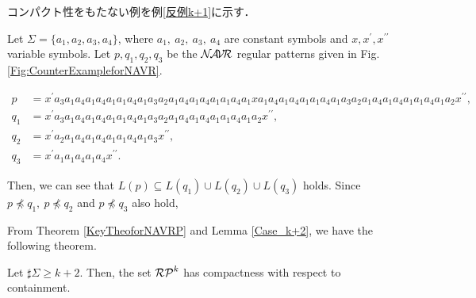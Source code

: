 コンパクト性をもたない例を例\ref{反例k+1}に示す．

\begin{ex}\label{Case_k+1}\label{反例k+1}
Let $\Sigma= \{a_{1}, a_{2}, a_{3}, a_{4} \}$, where $a_{1},~a_{2},~a_{3},~a_{4}$ are constant symbols and $x,x^{\prime},x^{\prime\prime}$ variable symbols.
Let $p,q_{1},q_{2},q_{3}$ be the $\mathcal{N\!A\!V\!R}$ regular patterns given in Fig. \ref{Fig:CounterExampleforNAVR}. 
\begin{figure*}[tb]
\begin{align*}
p & = x^{\prime}a_{3}a_{1}a_{4}a_{1}a_{4}a_{1}a_{1}a_{4}a_{1}a_{3}a_{2}a_{1}a_{4}a_{1}a_{4}a_{1}a_{1}a_{4}a_{1}xa_{1}a_{4}a_{1}a_{4}a_{1}a_{1}a_{4}a_{1}a_{3}a_{2}a_{1}a_{4}a_{1}a_{4}a_{1}a_{1}a_{4}a_{1}a_{2}x^{\prime\prime},\\
q_{1} & = x^{\prime}a_{3}a_{1}a_{4}a_{1}a_{4}a_{1}a_{1}a_{4}a_{1}a_{3}a_{2}a_{1}a_{4}a_{1}a_{4}a_{1}a_{1}a_{4}a_{1}a_{2}x^{\prime\prime},\\
q_{2} & = x^{\prime}a_{2}a_{1}a_{4}a_{1}a_{4}a_{1}a_{1}a_{4}a_{1}a_{3}x^{\prime\prime},\\
q_{3} & = x^{\prime}a_{1}a_{1}a_{4}a_{1}a_{4}x^{\prime\prime}.
\end{align*}
\caption{NAVR patterns $P$, $q_{1}$, $q_{2}$, and $q_{3}$}\label{Fig:CounterExampleforNAVR}
\end{figure*}
\noindent
Then, we can see that  $L(p) \subseteq L(q_{1}) \cup L(q_{2}) \cup L(q_{3})$ holds.
Since $p \not \preceq q_{1},~p \not \preceq q_{2}$ and $p \not \preceq q_{3}$ also hold,


\end{ex}

From Theorem \ref{KeyTheoforNAVRP} and Lemma \ref{Case_k+2}, we have the following theorem.

\begin{thm}\label{MainTheforNAVRP}
Let $\sharp\Sigma \ge k+2$.
Then, the set $\mathcal{RP}^{k}$ has compactness with respect to containment.
\end{thm}